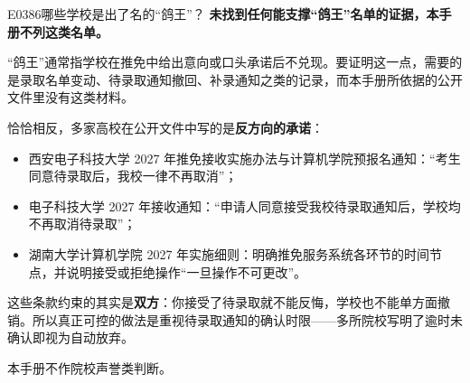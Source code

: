 \begin{qa}{E0386}{哪些学校是出了名的“鸽王”？}
\textbf{未找到任何能支撑“鸽王”名单的证据，本手册不列这类名单。}

“鸽王”通常指学校在推免中给出意向或口头承诺后不兑现。要证明这一点，需要的是录取名单变动、待录取通知撤回、补录通知之类的记录，而本手册所依据的公开文件里没有这类材料。

恰恰相反，多家高校在公开文件中写的是\textbf{反方向的承诺}：

\begin{itemize}
  \item 西安电子科技大学 2027 年推免接收实施办法与计算机学院预报名通知：“考生同意待录取后，我校一律不再取消”；
  \item 电子科技大学 2027 年接收通知：“申请人同意接受我校待录取通知后，学校均不再取消待录取”；
  \item 湖南大学计算机学院 2027 年实施细则：明确推免服务系统各环节的时间节点，并说明接受或拒绝操作“一旦操作不可更改”。
\end{itemize}

这些条款约束的其实是\textbf{双方}：你接受了待录取就不能反悔，学校也不能单方面撤销。所以真正可控的做法是重视待录取通知的确认时限——多所院校写明了逾时未确认即视为自动放弃。

本手册不作院校声誉类判断。
\end{qa}

